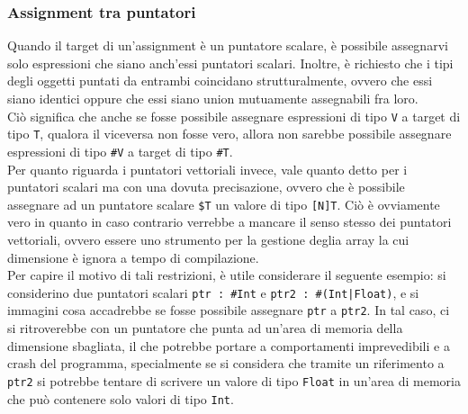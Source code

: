 \subsubsection{Assignment tra puntatori}
Quando il target di un'assignment è un puntatore scalare, è possibile assegnarvi solo 
espressioni che siano anch'essi puntatori scalari. Inoltre, è richiesto che i tipi degli oggetti puntati
da entrambi coincidano strutturalmente, ovvero che essi siano identici 
oppure che essi siano union mutuamente assegnabili fra loro. \\  

Ciò significa che anche se fosse possibile assegnare
espressioni di tipo \texttt{V} a target di tipo \texttt{T}, qualora il viceversa non fosse vero, 
allora non sarebbe possibile assegnare espressioni di tipo \texttt{\#V} a target di tipo \texttt{\#T}. \\

Per quanto riguarda i puntatori vettoriali invece, vale quanto detto per i puntatori scalari 
ma con una dovuta precisazione, ovvero che è possibile assegnare ad un puntatore scalare 
\texttt{\$T} un valore di tipo \texttt{[N]T}. Ciò è ovviamente vero in quanto in caso contrario 
verrebbe a mancare il senso stesso dei puntatori vettoriali, ovvero essere uno strumento per la 
gestione deglia array la cui dimensione è ignora a tempo di compilazione. \\

Per capire il motivo di tali restrizioni, è utile considerare il seguente esempio: si considerino
due puntatori scalari \texttt{ptr : \#Int} e \texttt{ptr2 : \#(Int|Float)}, e si immagini cosa 
accadrebbe se fosse possibile assegnare \texttt{ptr} a \texttt{ptr2}. In tal caso, ci si ritroverebbe
con un puntatore che punta ad un'area di memoria della dimensione sbagliata, il che potrebbe portare
a comportamenti imprevedibili e a crash del programma, specialmente se si considera che tramite  un 
riferimento a \texttt{ptr2} si potrebbe tentare di scrivere un valore di tipo \texttt{Float} in un'area
di memoria che può contenere solo valori di tipo \texttt{Int}. \\